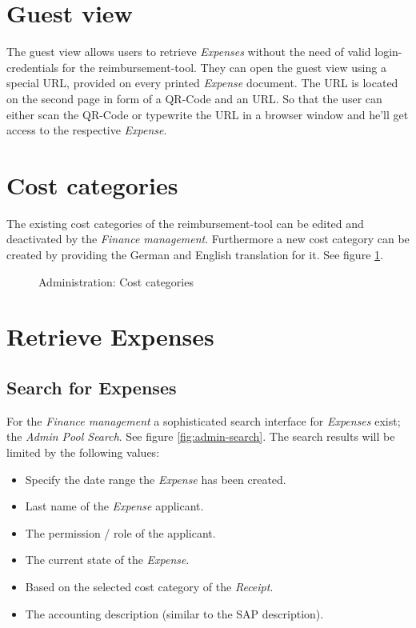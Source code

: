 \section{Guest view}
The guest view allows users to retrieve \textit{Expenses} without the need of valid login-credentials for the reimbursement-tool. They can open the guest view using a special URL, provided on every printed \textit{Expense} document. The URL is located on the second page in form of a QR-Code and an URL. So that the user can either scan the QR-Code or typewrite the URL in a browser window and he'll get access to the respective \textit{Expense}.

\section{Cost categories}

The existing cost categories of the reimbursement-tool can be edited and deactivated by the \textit{Finance management}. Furthermore a new cost category can be created by providing the German and English translation for it. See figure \ref{fig:admin-costcategories}.

\begin{figure}[H]
    \centering
    \caption{Administration: Cost categories}
    \label{fig:admin-costcategories}
\end{figure}

\section{Retrieve Expenses}
\subsection{Search for Expenses}

For the \textit{Finance management} a sophisticated search interface for \textit{Expenses} exist; the \textit{Admin Pool Search}. See figure \ref{fig:admin-search}. The search results will be limited by the following values:

\begin{itemize}
    \item Specify the date range the \textit{Expense} has been created.
    \item Last name of the \textit{Expense} applicant.
    \item The permission / role of the applicant.
    \item The current state of the \textit{Expense}.
    \item Based on the selected cost category of the \textit{Receipt}.
    \item The accounting description (similar to the SAP description).
\end{itemize}

